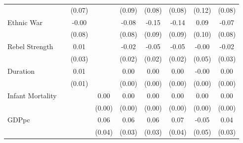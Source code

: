 \documentclass[12pt, letterpaper]{article}
\begin{document}
\begin{landscape}
\begin{table}[htbp]
\begin{footnotesize}
\begin{tabular}{l*{8}{c}}
                    &                     &      (0.07)         &                     &      (0.09)         &      (0.08)         &      (0.08)         &      (0.12)         &      (0.08)         \\
Ethnic War          &                     &       -0.00         &                     &       -0.08         &       -0.15\sym{+}  &       -0.14\sym{+}  &        0.09         &       -0.07         \\
                    &                     &      (0.08)         &                     &      (0.08)         &      (0.09)         &      (0.09)         &      (0.10)         &      (0.08)         \\
Rebel Strength      &                     &        0.01         &                     &       -0.02         &       -0.05\sym{*}  &       -0.05\sym{**} &       -0.00         &       -0.02         \\
                    &                     &      (0.03)         &                     &      (0.02)         &      (0.02)         &      (0.02)         &      (0.05)         &      (0.03)         \\
Duration            &                     &        0.01\sym{+}  &                     &        0.00         &        0.00         &        0.00         &       -0.00         &        0.00         \\
                    &                     &      (0.01)         &                     &      (0.00)         &      (0.00)         &      (0.00)         &      (0.00)         &      (0.00)         \\
Infant Mortality    &                     &                     &        0.00\sym{*}  &        0.00\sym{*}  &        0.00\sym{**} &        0.00\sym{**} &        0.00         &        0.00\sym{+}  \\
                    &                     &                     &      (0.00)         &      (0.00)         &      (0.00)         &      (0.00)         &      (0.00)         &      (0.00)         \\
GDPpc               &                     &                     &        0.06\sym{*}  &        0.06\sym{*}  &        0.06\sym{*}  &        0.07\sym{*}  &       -0.05         &        0.04         \\
                    &                     &                     &      (0.04)         &      (0.03)         &      (0.03)         &      (0.04)         &      (0.05)         &      (0.03)         \\

\end{tabular}
\end{footnotesize}
\end{table}
\end{landscape}
\end{document}
